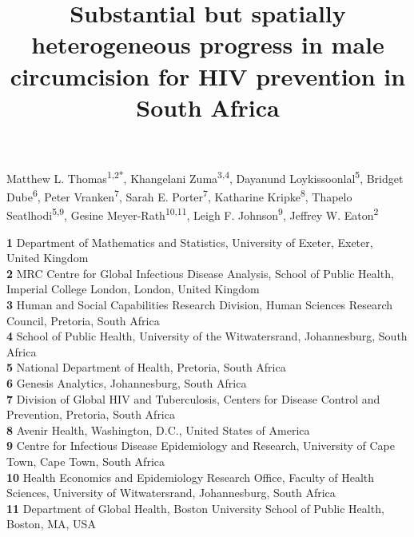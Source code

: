 \documentclass{article}
\title{Substantial but spatially heterogeneous progress in male circumcision for HIV prevention in South Africa}
\author{}
\date{}
\begin{document}

\maketitle

\vspace{-1cm}

Matthew L. Thomas\textsuperscript{1,2*},
Khangelani Zuma\textsuperscript{3,4},
Dayanund Loykissoonlal\textsuperscript{5},
Bridget Dube\textsuperscript{6},
Peter Vranken\textsuperscript{7},
Sarah E. Porter\textsuperscript{7},
Katharine Kripke\textsuperscript{8},
Thapelo Seatlhodi\textsuperscript{5,9},
Gesine Meyer-Rath\textsuperscript{10,11},
Leigh F. Johnson\textsuperscript{9},
Jeffrey W. Eaton\textsuperscript{2} \\
\smallskip
  
\textbf{1} Department of Mathematics and Statistics, University of Exeter, Exeter, United Kingdom\\
\textbf{2} MRC Centre for Global Infectious Disease Analysis, School of Public Health, Imperial College London, London, United Kingdom\\
\textbf{3} Human and Social Capabilities Research Division, Human Sciences Research Council,  Pretoria, South Africa\\
\textbf{4} School of Public Health, University of the Witwatersrand, Johannesburg, South Africa\\
\textbf{5} National Department of Health, Pretoria, South Africa\\
\textbf{6} Genesis Analytics, Johannesburg, South Africa\\
\textbf{7} Division of Global HIV and Tuberculosis, Centers for Disease Control and Prevention, Pretoria, South Africa\\
\textbf{8} Avenir Health, Washington, D.C., United States of America\\
\textbf{9} Centre for Infectious Disease Epidemiology and Research, University of Cape Town, Cape Town, South Africa \\
\textbf{10} Health Economics and Epidemiology Research Office, Faculty of Health Sciences, University of Witwatersrand, Johannesburg, South Africa\\
\textbf{11} Department of Global Health, Boston University School of Public Health, Boston, MA, USA\\
\smallskip
\end{document}
